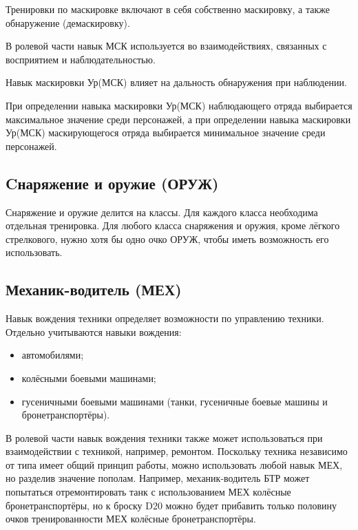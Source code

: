 \documentclass[
]{article}
\begin{document}
Тренировки по маскировке включают в себя собственно маскировку, а также
обнаружение (демаскировку).

В ролевой части навык МСК используется во взаимодействиях, связанных с
восприятием и наблюдательностью.

Навык маскировки Ур(МСК) влияет на дальность обнаружения при наблюдении.

При определении навыка маскировки Ур(МСК) наблюдающего отряда выбирается
максимальное значение среди персонажей, а при определении навыка
маскировки Ур(МСК) маскирующегося отряда выбирается минимальное значение
среди персонажей.

\subsection{Cнаряжение и оружие
(ОРУЖ)}\label{cux43dux430ux440ux44fux436ux435ux43dux438ux435-ux438-ux43eux440ux443ux436ux438ux435-ux43eux440ux443ux436}

Снаряжение и оружие делится на классы. Для каждого класса необходима
отдельная тренировка. Для любого класса снаряжения и оружия, кроме
лёгкого стрелкового, нужно хотя бы одно очко ОРУЖ, чтобы иметь
возможность его использовать.

\subsection{Механик-водитель
(МЕХ)}\label{ux43cux435ux445ux430ux43dux438ux43a-ux432ux43eux434ux438ux442ux435ux43bux44c-ux43cux435ux445}

Навык вождения техники определяет возможности по управлению техники.
Отдельно учитываются навыки вождения:

\begin{itemize}
\item
  автомобилями;
\item
  колёсными боевыми машинами;
\item
  гусеничными боевыми машинами (танки, гусеничные боевые машины и
  бронетранспортёры).
\end{itemize}

В ролевой части навык вождения техники также может использоваться при
взаимодействии с техникой, например, ремонтом. Поскольку техника
независимо от типа имеет общий принцип работы, можно использовать любой
навык МЕХ, но разделив значение пополам. Например, механик-водитель БТР
может попытаться отремонтировать танк с использованием МЕХ колёсные
бронетранспортёры, но к броску D20 можно будет прибавить только половину
очков тренированности МЕХ колёсные бронетранспортёры.
\end{document}
